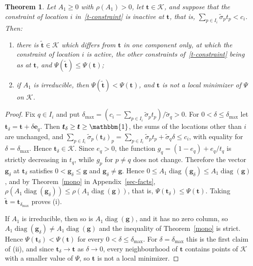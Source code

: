 \documentclass[11pt]{article}
\theoremstyle{plain}
\newtheorem{theorem}{Theorem}[section]
\theoremstyle{definition}
\theoremstyle{remark}
\renewcommand{\labelenumi}{\textbf{\arabic{enumi}.}}
\numberwithin{equation}{section}
\numberwithin{figure}{section}
\numberwithin{table}{section}
\numberwithin{algorithm}{section}
\begin{document}
\begin{theorem}\label{active}
Let $A_1\ge 0$ with $\rho(A_1)>0$, let $\bm t\in\mathcal{K}$, and suppose that the
constraint of location $i$ in~\eqref{t-constraint} is inactive at $\bm t$,
that is, $\sum_{p\in I_i}\widetilde\sigma_pt_p<c_i$. Then:
\begin{enumerate}
\renewcommand{\labelenumi}{(\roman{enumi})}
\item there is $\widetilde{\bm t}\in\mathcal{K}$ which differs from $\bm t$ in
one component only, at which the constraint of location $i$ is active, the
other constraints of~\eqref{t-constraint} being as at $\bm t$, and
$\Psi\left(\widetilde{\bm t}\right)\le\Psi(\bm t)$;
\item if $A_1$ is irreducible, then $\Psi\left(\widetilde{\bm t}\right)<\Psi(\bm t)$,
and $\bm t$ is not a local minimizer of $\Psi$ on $\mathcal{K}$.
\end{enumerate}
\end{theorem}
\begin{proof}
Fix $q\in I_i$ and put
$\delta_{\max}=\left(c_i-\sum_{p\in I_i}\widetilde\sigma_pt_p\right)/\widetilde\sigma_q>0$.
For $0<\delta\le\delta_{\max}$ let $\bm t_\delta=\bm t+\delta\bm e_q$. Then
$\bm t_\delta\ge\bm t\ge\mathbbm{1}$, the sums of the locations other than $i$
are unchanged, and
$\sum_{p\in I_i}\widetilde\sigma_p\left(\bm t_\delta\right)_p=\sum_{p\in I_i}\widetilde\sigma_pt_p+\widetilde\sigma_q\delta\le c_i$,
with equality for $\delta=\delta_{\max}$. Hence $\bm t_\delta\in\mathcal{K}$.
Since $e_q>0$, the function $g_q=(1-e_q)+e_q/t_q$
is strictly decreasing in $t_q$, while $g_p$ for $p\neq q$ does not change.
Therefore the vector $\bm g_\delta$ at $\bm t_\delta$ satisfies
$0<\bm g_\delta\le\bm g$ and $\bm g_\delta\neq\bm g$. Hence
$0\le A_1\operatorname{diag}\left(\bm g_\delta\right)\le A_1\operatorname{diag}(\bm g)$,
and by Theorem~\ref{mono} in Appendix~\ref{sec-facts},
$\rho\left(A_1\operatorname{diag}\left(\bm g_\delta\right)\right)\le\rho\left(A_1\operatorname{diag}(\bm g)\right)$,
that is, $\Psi\left(\bm t_\delta\right)\le\Psi(\bm t)$. Taking
$\widetilde{\bm t}=\bm t_{\delta_{\max}}$ proves (i).

If $A_1$ is irreducible, then so is $A_1\operatorname{diag}(\bm g)$, and it has
no zero column, so $A_1\operatorname{diag}\left(\bm g_\delta\right)\neq A_1\operatorname{diag}(\bm g)$
and the inequality of Theorem~\ref{mono} is strict. Hence
$\Psi\left(\bm t_\delta\right)<\Psi(\bm t)$ for every $0<\delta\le\delta_{\max}$.
For $\delta=\delta_{\max}$ this is the first claim of (ii), and since
$\bm t_\delta\to\bm t$ as $\delta\to 0$, every neighbourhood of $\bm t$ contains
points of $\mathcal{K}$ with a smaller value of $\Psi$, so $\bm t$ is not a
local minimizer.
\end{proof}
\end{document}
